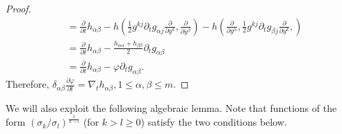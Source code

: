 \documentclass[reqno]{amsart}
\newtheorem{lemma}[theorem]{Lemma}
\theoremstyle{remark}
\newcommand{\R}{\ensuremath{\mathbb{R}}}
\newcommand{\pd}[2]{\frac{\partial {#1}}{\partial {#2}}}
\theoremstyle{definition}
\numberwithin{equation}{section}
\begin{document}
\begin{proof}
\[\begin{aligned}
        &= \pd{}{t} h_{\alpha\beta} - h\left(\frac{1}{2}g^{kj}\partial_{t}g_{\alpha j}\pd{}{y^k}, \pd{}{y^\beta}\right)-h\left( \pd{}{y^\alpha}, \frac{1}{2}g^{kj}\partial_{t}g_{\beta j}\pd{}{y^k},\right)\\
        &= \pd{}{t} h_{\alpha\beta} - \frac{h_{\alpha\alpha}+h_{\beta\beta}}{2}\partial_{t}g_{\alpha\beta} \\
        &= \pd{}{t} h_{\alpha\beta} - \varphi\partial_{t}g_{\alpha\beta}.
    \end{aligned}  \] 
    Therefore, \(\delta_{\alpha\beta}\pd{\varphi}{t} = \nabla_t h_{\alpha\beta}, 1\leq \alpha,\beta \leq m\).
\end{proof}

We will also exploit the following algebraic lemma. Note that functions of the form \((\sigma_k / \sigma_l)^{\frac{1}{k-l}}\) (for \(k > l \geq 0\)) satisfy the two conditions below.
\end{document}
